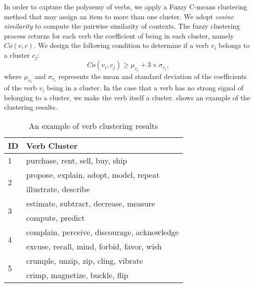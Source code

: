 In order to capture the polysemy of verbs, we apply a Fuzzy C-means
clustering method\cite{dunn73:fuzzycmeans} that may assign an item
to more than one cluster. We adopt \emph{cosine similarity}
to compute the pairwise similarity of contexts.
The fuzzy clustering process returns for each verb the coefficient
of being in each cluster, namely $Co(v,c)$.
We design
the following condition to determine if a verb $v_i$
belongs to a cluster $c_j$:
$$
Co(v_i,c_j) \geq \mu_{v_i} + 3 \times \sigma_{v_i},
$$
where $\mu_{v_i}$ and $\sigma_{v_i}$ represents the mean and
standard deviation of the coefficients of the verb $v_i$
being in a cluster.
In the case that a verb has no strong signal of
belonging to a cluster, we make the verb itself a cluster.
 shows an example of the clustering results.
\begin{table}[th]
\small
\center
\caption{An example of verb clustering results}
\begin{tabular}{|l|l|}
\hline
ID  &   Verb Cluster \\
\hline \hline
1   &   purchase, rent, sell, buy, ship\\
\hline
\multirow{2}{*}{2}
    &   propose, explain, adopt, model, repeat\\
    &   illustrate, describe\\
\hline
\multirow{2}{*}{3}
    &   estimate, subtract, decrease, measure\\
    &   compute, predict\\
\hline
\multirow{2}{*}{4}
    &   complain, perceive, discourage, acknowledge\\
    &   excuse, recall, mind, forbid, favor, wish\\
\hline
\multirow{2}{*}{5}
    &   crumple, unzip, zip, cling, vibrate\\
    &   crimp, magnetize, buckle, flip \\
\hline
\end{tabular}
\label{tab:cluster}
\end{table}

